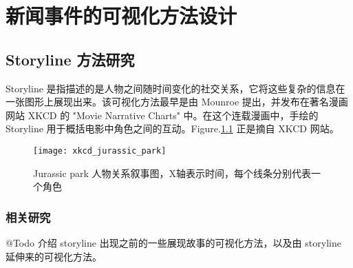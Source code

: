 \chapter{新闻事件的可视化方法设计}

\section{Storyline 方法研究}
Storyline 是指描述的是人物之间随时间变化的社交关系，它将这些复杂的信息在一张图形上展现出来。该可视化方法最早是由 Mounroe 提出，并发布在著名漫画网站 XKCD 的 "Movie Narrative Charts" \cite{xkcd657} 中。在这个连载漫画中，手绘的 Storyline 用于概括电影中角色之间的互动。Figure.\ref{xkcd} 正是摘自 XKCD 网站。
\begin{figure}[htb]
	\centering
		\texttt{[image: xkcd\_jurassic\_park]}
	\caption{Jurassic park 人物关系叙事图，X轴表示时间，每个线条分别代表一个角色}
	\label{xkcd}
\end{figure}


\subsection{相关研究}
@Todo 介绍 storyline 出现之前的一些展现故事的可视化方法，以及由 storyline 延伸来的可视化方法。


